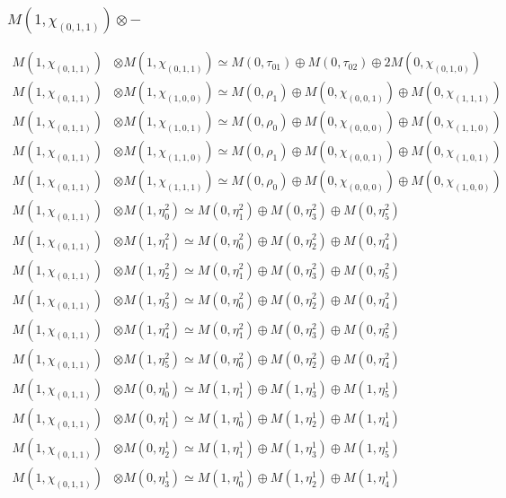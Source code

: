 \subsubsection{$ M(1,\chi_{(0,1,1)})\otimes -$}
\begin{align*}
M(1,\chi_{(0,1,1)}) &\otimes M(1,\chi_{(0,1,1)}) \simeq M(0,\tau_{01}) \oplus M(0,\tau_{02}) \oplus 2 M(0,\chi_{(0,1,0)}) \\
M(1,\chi_{(0,1,1)}) &\otimes M(1,\chi_{(1,0,0)}) \simeq M(0,\rho_{1}) \oplus M(0,\chi_{(0,0,1)}) \oplus M(0,\chi_{(1,1,1)}) \\
M(1,\chi_{(0,1,1)}) &\otimes M(1,\chi_{(1,0,1)}) \simeq M(0,\rho_{0}) \oplus M(0,\chi_{(0,0,0)}) \oplus M(0,\chi_{(1,1,0)}) \\
M(1,\chi_{(0,1,1)}) &\otimes M(1,\chi_{(1,1,0)}) \simeq M(0,\rho_{1}) \oplus M(0,\chi_{(0,0,1)}) \oplus M(0,\chi_{(1,0,1)}) \\
M(1,\chi_{(0,1,1)}) &\otimes M(1,\chi_{(1,1,1)}) \simeq M(0,\rho_{0}) \oplus M(0,\chi_{(0,0,0)}) \oplus M(0,\chi_{(1,0,0)}) \\
M(1,\chi_{(0,1,1)}) &\otimes M(1,\eta^{2}_{0}) \simeq M(0,\eta^{2}_{1}) \oplus M(0,\eta^{2}_{3}) \oplus M(0,\eta^{2}_{5}) \\
M(1,\chi_{(0,1,1)}) &\otimes M(1,\eta^{2}_{1}) \simeq M(0,\eta^{2}_{0}) \oplus M(0,\eta^{2}_{2}) \oplus M(0,\eta^{2}_{4}) \\
M(1,\chi_{(0,1,1)}) &\otimes M(1,\eta^{2}_{2}) \simeq M(0,\eta^{2}_{1}) \oplus M(0,\eta^{2}_{3}) \oplus M(0,\eta^{2}_{5}) \\
M(1,\chi_{(0,1,1)}) &\otimes M(1,\eta^{2}_{3}) \simeq M(0,\eta^{2}_{0}) \oplus M(0,\eta^{2}_{2}) \oplus M(0,\eta^{2}_{4}) \\
M(1,\chi_{(0,1,1)}) &\otimes M(1,\eta^{2}_{4}) \simeq M(0,\eta^{2}_{1}) \oplus M(0,\eta^{2}_{3}) \oplus M(0,\eta^{2}_{5}) \\
M(1,\chi_{(0,1,1)}) &\otimes M(1,\eta^{2}_{5}) \simeq M(0,\eta^{2}_{0}) \oplus M(0,\eta^{2}_{2}) \oplus M(0,\eta^{2}_{4}) \\
M(1,\chi_{(0,1,1)}) &\otimes M(0,\eta^{1}_{0}) \simeq M(1,\eta^{1}_{1}) \oplus M(1,\eta^{1}_{3}) \oplus M(1,\eta^{1}_{5}) \\
M(1,\chi_{(0,1,1)}) &\otimes M(0,\eta^{1}_{1}) \simeq M(1,\eta^{1}_{0}) \oplus M(1,\eta^{1}_{2}) \oplus M(1,\eta^{1}_{4}) \\
M(1,\chi_{(0,1,1)}) &\otimes M(0,\eta^{1}_{2}) \simeq M(1,\eta^{1}_{1}) \oplus M(1,\eta^{1}_{3}) \oplus M(1,\eta^{1}_{5}) \\
M(1,\chi_{(0,1,1)}) &\otimes M(0,\eta^{1}_{3}) \simeq M(1,\eta^{1}_{0}) \oplus M(1,\eta^{1}_{2}) \oplus M(1,\eta^{1}_{4}) \\

\end{align*}
